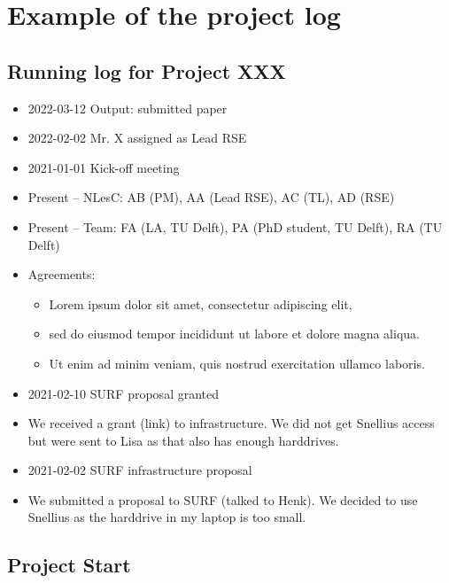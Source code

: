 \section{Example of the project log}
\label{app:example-log}
\subsection*{Running log for Project XXX}

\begin{itemize}[leftmargin=*,label={}]
   \item 2022-03-12 Output: submitted paper
   \item 2022-02-02 Mr. X assigned as Lead RSE
   \item 2021-01-01 Kick-off meeting
   \item Present – NLesC: AB (PM), AA (Lead RSE), AC (TL), AD (RSE)
   \item Present – Team: FA (LA, TU Delft), PA (PhD student, TU Delft), RA (TU Delft)
   \item Agreements:
    \begin{itemize}
    \item Lorem ipsum dolor sit amet, consectetur adipiscing elit,
    \item sed do eiusmod tempor incididunt ut labore et dolore magna aliqua.
    \item Ut enim ad minim veniam, quis nostrud exercitation ullamco laboris.
    \end{itemize}
   \item 2021-02-10 SURF proposal granted 
   \item We received a grant (link) to infrastructure. We did not get Snellius access but were sent to Lisa as that also has
enough harddrives.
   \item 2021-02-02 SURF infrastructure proposal
   \item We submitted a proposal to SURF (talked to Henk). We decided to use Snellius as the harddrive in my laptop is too
small.
\end{itemize}

\bigskip


\subsection*{Project Start}

